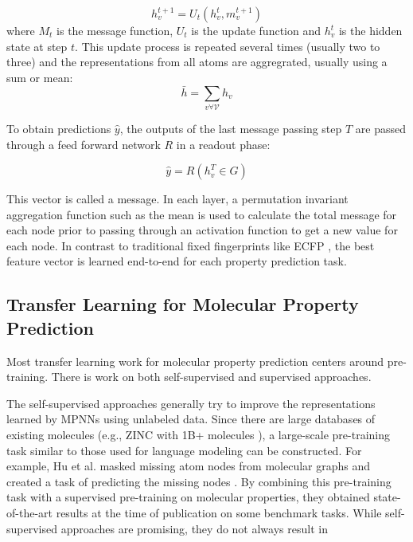 \begin{equation}
    h_v^{t+1} = U_t(h_v^t, m_v^{t+1})
\end{equation}
where $M_t$ is the message function, $U_t$ is the update function and $h_v^{t}$ is the hidden state at step $t$. This update process is repeated several times (usually two to three) and the representations from all atoms are aggregrated, usually using a sum or mean:
\begin{equation}
    \bar h = \sum_{v\forall \mathcal V} h_v
\end{equation}

To obtain predictions $\hat y$, the outputs of the last message passing step $T$ are passed through a feed forward network $R$ in a readout phase:

\begin{equation}
    \hat y = R(h_v^T \in G)
\end{equation}

This  vector is called a message. In each layer, a permutation invariant aggregation function such as the mean is used to calculate the total message for each node prior to passing through an activation function to get a new value for each node.  In contrast to traditional fixed fingerprints like ECFP \cite{Rogers2010}, the best feature vector is learned end-to-end for each property prediction task.

\subsection{Transfer Learning for Molecular Property Prediction}

Most transfer learning work for molecular property prediction centers around pre-training. There is work on both self-supervised and supervised approaches.

The self-supervised approaches generally try to improve the representations learned by MPNNs using unlabeled data. Since there are large databases of existing molecules (e.g., ZINC with 1B+ molecules \cite{Irwin2020}), a large-scale pre-training task similar to those used for language modeling can be constructed. For example, Hu et al. masked missing atom nodes from molecular graphs and created a task of predicting the missing nodes \cite{Hu2020Pretrain}. By combining this pre-training task with a supervised pre-training on molecular properties, they obtained state-of-the-art results at the time of publication on some benchmark tasks. While self-supervised approaches are promising, they do not always result in

